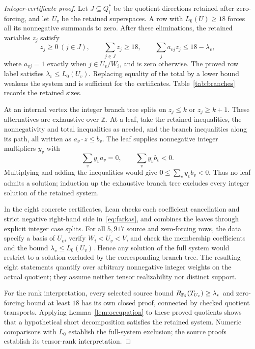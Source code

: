 \begin{proof}[Integer-certificate proof]
Let $J\subseteq Q_i^*$ be the quotient directions retained after
zero-forcing, and let $U_v$ be the retained superspaces. A row
with $L_0(U)\geq18$ forces all its nonnegative summands to zero. After
these eliminations, the retained variables $z_j$ satisfy
\begin{equation}\label{eq:retained}
 z_j\geq0\ (j\in J),\qquad \sum_{j\in J}z_j\geq18,\qquad
 \sum_j a_{vj}z_j\leq18-\lambda_v,
\end{equation}
where $a_{vj}=1$ exactly when $j\in U_v/W_i$, and is zero otherwise.
The proved row label satisfies
$\lambda_v\leq L_0(U_v)$. Replacing equality of the total by a lower
bound weakens the system and is sufficient for the certificates.
Table~\ref{tab:branches} records the retained sizes.

At an internal vertex the integer branch tree splits on
$z_j\leq k$ or $z_j\geq k+1$. These alternatives are exhaustive over
$\mathbb Z$. At a leaf, take the retained inequalities, the
nonnegativity and total inequalities as needed, and the branch
inequalities along its path, all written as $a_v\cdot z\leq b_v$.
The leaf supplies nonnegative integer multipliers $y_v$ with
\begin{equation}\label{eq:farkas}
 \sum_v y_v a_v=0,\qquad \sum_v y_v b_v<0.
\end{equation}
Multiplying and adding the inequalities would give
$0\leq\sum_v y_vb_v<0$. Thus no leaf admits a solution; induction up
the exhaustive branch tree excludes every integer solution of the
retained system.

In the eight concrete certificates, Lean checks each coefficient
cancellation and strict negative right-hand side in~\eqref{eq:farkas},
and combines the leaves through explicit integer case splits. For all
$5{,}917$ source and zero-forcing rows, the data specify a basis of
$U_v$, verify $W_i<U_v<V$, and check the membership coefficients
and the bound $\lambda_v\leq L_0(U_v)$. Hence any
solution of the full system would restrict to a solution excluded by
the corresponding branch tree. The resulting eight statements quantify
over arbitrary nonnegative integer weights on the actual quotient;
they assume neither tensor realizability nor distinct support.

For the rank interpretation, every selected source bound
$R_{\mathbb F_2}(T_{U_v})\geq\lambda_v$ and zero-forcing bound at least $18$
has its own closed proof, connected by checked quotient transports.
Applying Lemma~\ref{lem:occupation} to these proved quotients shows
that a hypothetical short decomposition satisfies the retained
system. Numeric comparisons with $L_0$ establish the full-system
exclusion; the source proofs establish its tensor-rank interpretation.
\end{proof}

